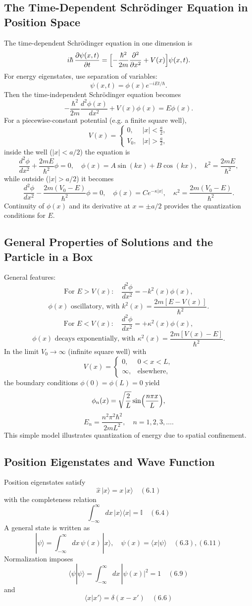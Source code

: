 \documentclass[twocolumn]{article}
\begin{document}
\begin{spacing}{1}
\subsection{The Time-Dependent Schrödinger Equation in Position Space}
The time-dependent Schrödinger equation in one dimension is
\[
i\hbar\,\frac{\partial\psi(x,t)}{\partial t}=\Bigl[-\frac{\hbar^2}{2m}\frac{\partial^2}{\partial x^2}+V(x)\Bigr]\psi(x,t).
\]
For energy eigenstates, use separation of variables:
\[
\psi(x,t)=\phi(x)e^{-iEt/\hbar}.
\]
Then the time-independent Schrödinger equation becomes
\[
-\frac{\hbar^2}{2m}\frac{d^2\phi(x)}{dx^2}+V(x)\phi(x)=E\phi(x).
\]
For a piecewise-constant potential (e.g. a finite square well),
\[
V(x)=
\begin{cases}
0,& |x|<\frac{a}{2},\\[1mm]
V_0,& |x|>\frac{a}{2},
\end{cases}
\]
inside the well (\(|x|<a/2\)) the equation is
\[
\frac{d^2\phi}{dx^2}+\frac{2mE}{\hbar^2}\phi=0,\quad \phi(x)=A\sin(kx)+B\cos(kx),\quad k^2=\frac{2mE}{\hbar^2},
\]
while outside (\(|x|>a/2\)) it becomes
\[
\frac{d^2\phi}{dx^2}-\frac{2m(V_0-E)}{\hbar^2}\phi=0,\quad \phi(x)=Ce^{-\kappa|x|},\quad \kappa^2=\frac{2m(V_0-E)}{\hbar^2}.
\]
Continuity of \(\phi(x)\) and its derivative at \(x=\pm a/2\) provides the quantization conditions for \(E\).

\subsection{General Properties of Solutions and the Particle in a Box}
General features:
\[
\text{For }E>V(x):\quad \frac{d^2\phi}{dx^2}=-k^2(x)\phi(x),
\]
\[
 \phi(x)\text{ oscillatory, with } k^2(x)=\frac{2m[E-V(x)]}{\hbar^2}.
\]
\[
\text{For }E<V(x):\quad \frac{d^2\phi}{dx^2}=+\kappa^2(x)\phi(x),
\]
\[
 \phi(x)\text{ decays exponentially, with } \kappa^2(x)=\frac{2m[V(x)-E]}{\hbar^2}.
\]
In the limit \(V_0\to\infty\) (infinite square well) with
\[
V(x)=
\begin{cases}
0,& 0<x<L,\\[1mm]
\infty,& \text{elsewhere},
\end{cases}
\]
the boundary conditions \(\phi(0)=\phi(L)=0\) yield
\[
\phi_n(x)=\sqrt{\frac{2}{L}}\sin\Bigl(\frac{n\pi x}{L}\Bigr),
\]
\[
 E_n=\frac{n^2\pi^2\hbar^2}{2mL^2},\quad n=1,2,3,\dots.
\]
This simple model illustrates quantization of energy due to spatial confinement.

\subsection{Position Eigenstates and Wave Function}
Position eigenstates satisfy 
\[
\hat{x}\,|x\rangle = x\,|x\rangle \quad (6.1)
\]
with the completeness relation 
\[
\int_{-\infty}^{\infty} dx\, |x\rangle \langle x| = \mathbb{I} \quad (6.4)
\]
A general state is written as
\[
|\psi\rangle = \int_{-\infty}^{\infty} dx\, \psi(x)\, |x\rangle,\quad \psi(x)=\langle x|\psi\rangle \quad (6.3),(6.11)
\]
Normalization imposes
\[
\langle \psi|\psi\rangle = \int_{-\infty}^{\infty} dx\, |\psi(x)|^2 =1 \quad (6.9)
\]
and 
\[
\langle x|x'\rangle = \delta(x-x') \quad (6.6)
\]


\end{spacing}
\end{document}
